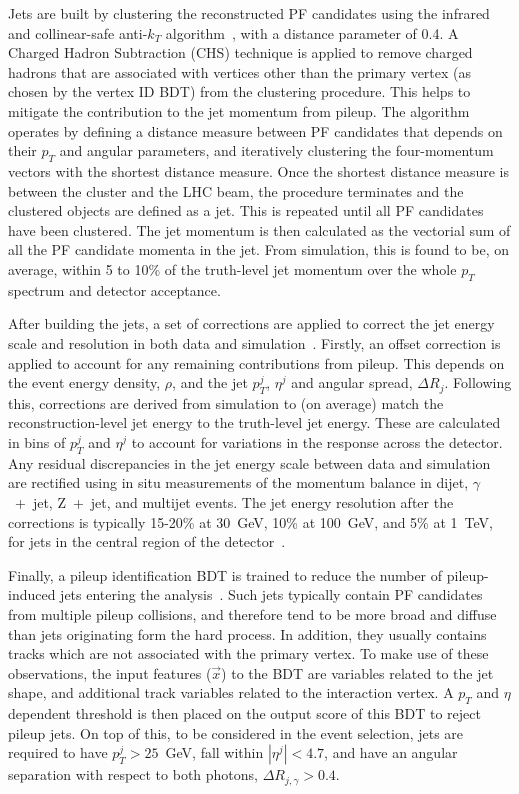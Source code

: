Jets are built by clustering the reconstructed PF candidates using the infrared and collinear-safe anti-$k_T$ algorithm~\cite{Cacciari:2008gp,Cacciari:2011ma}, with a distance parameter of 0.4. A Charged Hadron Subtraction (CHS) technique is applied to remove charged hadrons that are associated with vertices other than the primary vertex (as chosen by the vertex ID BDT) from the clustering procedure. This helps to mitigate the contribution to the jet momentum from pileup. The algorithm operates by defining a distance measure between PF candidates that depends on their $p_T$ and angular parameters, and iteratively clustering the four-momentum vectors with the shortest distance measure. Once the shortest distance measure is between the cluster and the LHC beam, the procedure terminates and the clustered objects are defined as a jet. This is repeated until all PF candidates have been clustered. The jet momentum is then calculated as the vectorial sum of all the PF candidate momenta in the jet. From simulation, this is found to be, on average, within 5 to 10\% of the truth-level jet momentum over the whole $p_T$ spectrum and detector acceptance.

After building the jets, a set of corrections are applied to correct the jet energy scale and resolution in both data and simulation~\cite{Khachatryan:2016kdb}. Firstly, an offset correction is applied to account for any remaining contributions from pileup. This depends on the event energy density, $\rho$, and the jet $p_T^j$, $\eta^j$ and angular spread, $\Delta R_j$. Following this, corrections are derived from simulation to (on average) match the reconstruction-level jet energy to the truth-level jet energy. These are calculated in bins of $p_T^j$ and $\eta^j$ to account for variations in the response across the detector. Any residual discrepancies in the jet energy scale between data and simulation are rectified using in situ measurements of the momentum balance in dijet, $\gamma$~+~jet, Z~+~jet, and multijet events. The jet energy resolution after the corrections is typically 15-20\% at 30~GeV, 10\% at 100~GeV, and 5\% at 1~TeV, for jets in the central region of the detector~\cite{Khachatryan:2016kdb}.

Finally, a pileup identification BDT is trained to reduce the number of pileup-induced jets entering the analysis~\cite{Sirunyan:2020foa}. Such jets typically contain PF candidates from multiple pileup collisions, and therefore tend to be more broad and diffuse than jets originating form the hard process. In addition, they usually contains tracks which are not associated with the primary vertex. To make use of these observations, the input features ($\vec{x}$) to the BDT are variables related to the jet shape, and additional track variables related to the interaction vertex. A $p_T$ and $\eta$ dependent threshold is then placed on the output score of this BDT to reject pileup jets. On top of this, to be considered in the event selection, jets are required to have $p_T^j>25$~GeV, fall within $|\eta^j|<4.7$, and have an angular separation with respect to both photons, $\Delta R_{j,\gamma}>0.4$.

